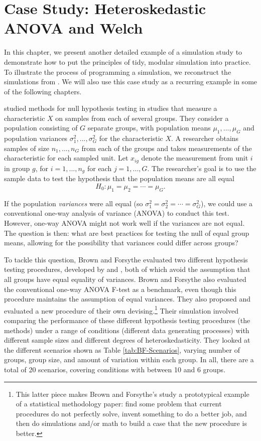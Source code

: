 \documentclass[
]{book}
\begin{document}
\chapter{Case Study: Heteroskedastic ANOVA and Welch}\label{case-ANOVA}

In this chapter, we present another detailed example of a simulation study to demonstrate how to put the principles of tidy, modular simulation into practice.
To illustrate the process of programming a simulation, we reconstruct the simulations from \citet{brown1974SmallSampleBehavior}.
We will also use this case study as a recurring example in some of the following chapters.

\citet{brown1974SmallSampleBehavior} studied methods for null hypothesis testing in studies that measure a characteristic \(X\) on samples from each of several groups. They consider a population consisting of \(G\) separate groups, with population means \(\mu_1,...,\mu_G\) and population variances \(\sigma_1^2,...,\sigma_G^2\) for the characteristic \(X\).
A researcher obtains samples of size \(n_1,...,n_G\) from each of the groups and takes measurements of the characteristic for each sampled unit.
Let \(x_{ig}\) denote the measurement from unit \(i\) in group \(g\), for \(i = 1,...,n_g\) for each \(j = 1,..., G\).
The researcher's goal is to use the sample data to test the hypothesis that the population means are all equal
\[
H_0: \mu_1 = \mu_2 = \cdots = \mu_G.
\]

If the population \emph{variances} were all equal (so \(\sigma_1^2 = \sigma_2^2 = \cdots = \sigma_G^2\)), we could use a conventional one-way analysis of variance (ANOVA) to conduct this test.
However, one-way ANOVA might not work well if the variances are not equal.
The question is then: what are best practices for testing the null of equal group means, allowing for the possibility that variances could differ across groups?

To tackle this question, Brown and Forsythe evaluated two different hypothesis testing procedures, developed by \citet{james1951ComparisonSeveralGroups} and \citet{welch1951ComparisonSeveralMean}, both of which avoid the assumption that all groups have equal equality of variances.
Brown and Forsythe also evaluated the conventional one-way ANOVA F-test as a benchmark, even though this procedure maintains the assumption of equal variances.
They also proposed and evaluated a new procedure of their own devising.\footnote{This latter piece makes Brown and Forsythe's study a prototypical example of a statistical methodology paper: find some problem that current procedures do not perfectly solve, invent something to do a better job, and then do simulations and/or math to build a case that the new procedure is better.}
Their simulation involved comparing the performance of these different hypothesis testing procedures (the methods) under a range of conditions (different data generating processes) with different sample sizes and different degrees of heteroskedasticity.
They looked at the different scenarios shown as Table \ref{tab:BF-Scenarios}, varying number of groups, group size, and amount of variation within each group.
In all, there are a total of 20 scenarios, covering conditions with between 10 and 6 groups.
\end{document}
